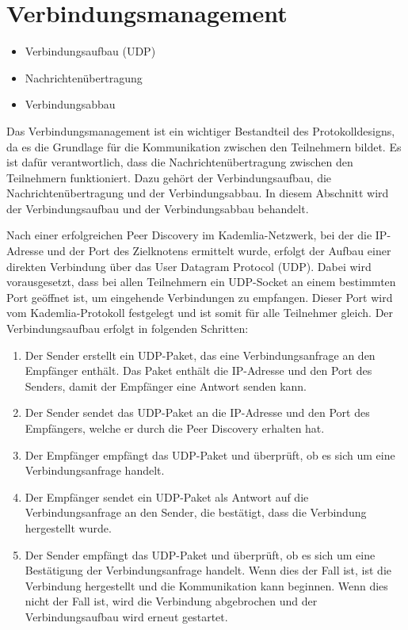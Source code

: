 \section{Verbindungsmanagement}
\label{subsec:routing}

\begin{itemize}
    \item Verbindungsaufbau (UDP)
    \item Nachrichtenübertragung
    \item Verbindungsabbau
\end{itemize}


\noindent Das Verbindungsmanagement ist ein wichtiger Bestandteil des Protokolldesigns, da es die Grundlage für die Kommunikation zwischen den Teilnehmern bildet. Es ist dafür verantwortlich, dass die Nachrichtenübertragung zwischen den Teilnehmern funktioniert. Dazu gehört der Verbindungsaufbau, die Nachrichtenübertragung und der Verbindungsabbau. In diesem Abschnitt wird der Verbindungsaufbau und der Verbindungsabbau behandelt.


Nach einer erfolgreichen Peer Discovery im Kademlia-Netzwerk, bei der die IP-Adresse und der Port des Zielknotens ermittelt wurde, erfolgt der Aufbau einer direkten Verbindung über das User Datagram Protocol (UDP). Dabei wird vorausgesetzt, dass bei allen Teilnehmern ein UDP-Socket an einem bestimmten Port geöffnet ist, um eingehende Verbindungen zu empfangen. Dieser Port wird vom Kademlia-Protokoll festgelegt und ist somit für alle Teilnehmer gleich.
Der Verbindungsaufbau erfolgt in folgenden Schritten:

\begin{enumerate}
    \item Der Sender erstellt ein UDP-Paket, das eine Verbindungsanfrage an den Empfänger enthält. Das Paket enthält die IP-Adresse und den Port des Senders, damit der Empfänger eine Antwort senden kann.
    \item Der Sender sendet das UDP-Paket an die IP-Adresse und den Port des Empfängers, welche er durch die Peer Discovery erhalten hat.
    \item Der Empfänger empfängt das UDP-Paket und überprüft, ob es sich um eine Verbindungsanfrage handelt.
    \item Der Empfänger sendet ein UDP-Paket als Antwort auf die Verbindungsanfrage an den Sender, die bestätigt, dass die Verbindung hergestellt wurde.
    \item Der Sender empfängt das UDP-Paket und überprüft, ob es sich um eine Bestätigung der Verbindungsanfrage handelt. Wenn dies der Fall ist, ist die Verbindung hergestellt und die Kommunikation kann beginnen. Wenn dies nicht der Fall ist, wird die Verbindung abgebrochen und der Verbindungsaufbau wird erneut gestartet.
\end{enumerate}

